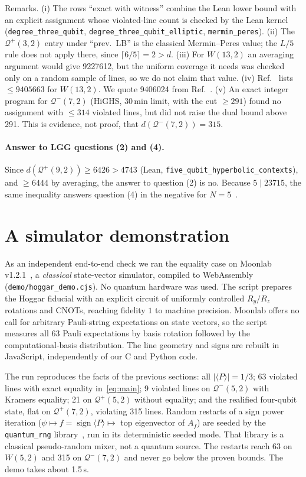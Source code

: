 \documentclass[aps,pra,onecolumn,11pt,superscriptaddress,nofootinbib]{revtex4-2}
\theoremstyle{definition}
\theoremstyle{remark}
\newcommand{\Qp}{\mathcal{Q}^{+}}
\newcommand{\Qm}{\mathcal{Q}^{-}}
\newcommand{\lean}[1]{\texttt{#1}}
\begin{document}
\noindent Remarks. (i) The rows ``exact with witness'' combine the Lean lower bound with an
explicit assignment whose violated-line count is checked by the Lean kernel
(\lean{degree\_three\_qubit}, \lean{degree\_three\_qubit\_elliptic}, \lean{mermin\_peres}).
(ii) The $\Qp(3,2)$ entry under ``prev.\ LB'' is the classical Mermin--Peres value; the $L/5$
rule does not apply there, since $\lceil6/5\rceil=2>d$. (iii) For $W(13,2)$ an averaging argument would
give 9227612, but the uniform coverage it needs was checked only on a random sample of lines, so
we do not claim that value. (iv) Ref.~\cite{MullerGiorgetti2025} lists $\le9405663$ for $W(13,2)$. We quote
9406024 from Ref.~\cite{Muller2025heur}. (v) An exact integer program for $\Qm(7,2)$
(HiGHS, 30\,min limit, with the cut $\ge291$) found no assignment with $\le314$ violated lines,
but did not raise the dual bound above 291. This is evidence, not proof, that $d(\Qm(7,2))=315$.

\paragraph*{Answer to LGG questions (2) and (4).}
Since $d(\Qp(9,2))\ge6426>4743$ (Lean, \lean{five\_qubit\_hyperbolic\_contexts}), and
$\ge6444$ by averaging, the answer to question (2) is no. Because $5\mid23715$, the same
inequality answers question (4) in the negative for $N=5$~\cite{LGG2026}.

\section{A simulator demonstration}

As an independent end-to-end check we ran the equality case on Moonlab
v1.2.1~\cite{moonlab}, a \emph{classical} state-vector simulator, compiled to WebAssembly
(\texttt{demo/hoggar\_demo.cjs}). No quantum hardware was used. The script prepares the
Hoggar fiducial with an explicit circuit of uniformly controlled $R_y/R_z$ rotations and CNOTs,
reaching fidelity $1$ to machine precision. Moonlab offers no call for arbitrary Pauli-string
expectations on state vectors, so the script measures all 63 Pauli expectations by basis
rotation followed by the computational-basis distribution. The line geometry and signs are
rebuilt in JavaScript, independently of our C and Python code.

The run reproduces the facts of the previous sections: all $|\langle P\rangle|=1/3$; 63
violated lines with exact equality in~\eqref{eq:main}; 9 violated lines on $\Qm(5,2)$ with
Kramers equality; 21 on $\Qp(5,2)$ without equality; and the realified four-qubit state, flat
on $\Qp(7,2)$, violating 315 lines. Random restarts of a sign power iteration
($\psi\mapsto f=\operatorname{sign}\langle P\rangle\mapsto$ top eigenvector of $A_f$) are seeded
by the \texttt{quantum\_rng} library~\cite{qrng}, run in its deterministic seeded mode. That
library is a classical pseudo-random mixer, not a quantum source. The restarts reach 63 on
$W(5,2)$ and 315 on $\Qm(7,2)$ and never go below the proven bounds. The demo takes about
1.5\,s.
\end{document}
